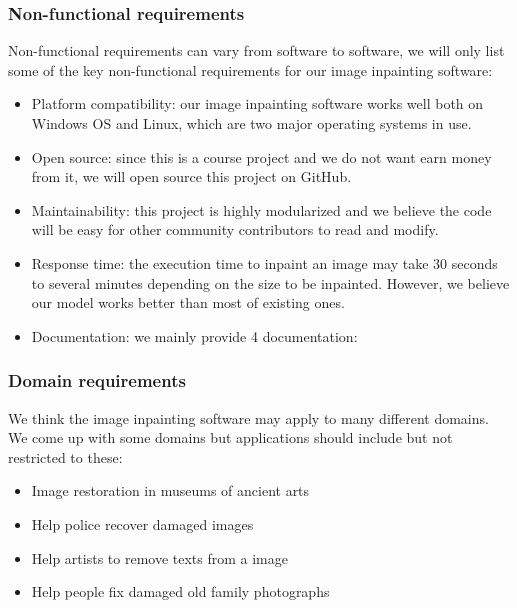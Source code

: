 \subsubsection{Non-functional requirements}
Non-functional requirements can vary from software to software, we will only list some of the key non-functional requirements for our image inpainting software:
\begin{itemize}
\item Platform compatibility: our image inpainting software works well both on Windows OS and Linux, which are two major operating systems in use.
\item Open source: since this is a course project and we do not want earn money from it, we will open source this project on GitHub.
\item Maintainability: this project is highly modularized and we believe the code will be easy for other community contributors to read and modify.
\item Response time: the execution time to inpaint an image may take 30 seconds to several minutes depending on the size to be inpainted. However, we believe our model works better than most of existing ones.
\item Documentation: we mainly provide 4 documentation:
\end{itemize}
\subsubsection{Domain requirements}
We think the image inpainting software may apply to many different domains. We come up with some domains but applications should include but not restricted to these:
\begin{itemize}
\item Image restoration in museums of ancient arts
\item Help police recover damaged images
\item Help artists to remove texts from a image
\item Help people fix damaged old family photographs
\end{itemize}
